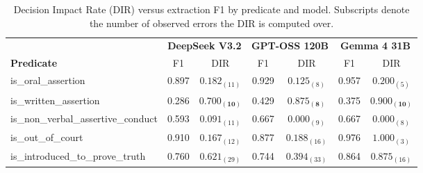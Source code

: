 \begin{table}[htbp]
\centering
\caption{Decision Impact Rate (DIR) versus extraction F1 by predicate and model. Subscripts denote the number of observed errors the DIR is computed over.}
\label{tab:dir}
\begin{tabular}{lcccccc}
\toprule
& \multicolumn{2}{c}{\textbf{DeepSeek V3.2}} & \multicolumn{2}{c}{\textbf{GPT-OSS 120B}} & \multicolumn{2}{c}{\textbf{Gemma 4 31B}} \\
\textbf{Predicate} & F1 & DIR & F1 & DIR & F1 & DIR \\
\midrule
is\_oral\_assertion                 & 0.897 & $0.182_{(11)}$ & 0.929 & $0.125_{(8)}$  & 0.957 & $0.200_{(5)}$  \\
is\_written\_assertion              & 0.286 & $\mathbf{0.700_{(10)}}$ & 0.429 & $\mathbf{0.875_{(8)}}$  & 0.375 & $\mathbf{0.900_{(10)}}$ \\
is\_non\_verbal\_assertive\_conduct & 0.593 & $0.091_{(11)}$ & 0.667 & $0.000_{(9)}$  & 0.667 & $0.000_{(8)}$  \\
is\_out\_of\_court                  & 0.910 & $0.167_{(12)}$ & 0.877 & $0.188_{(16)}$ & 0.976 & $1.000_{(3)}$  \\
is\_introduced\_to\_prove\_truth    & 0.760 & $0.621_{(29)}$ & 0.744 & $0.394_{(33)}$ & 0.864 & $0.875_{(16)}$ \\
\bottomrule
\end{tabular}
\end{table}

